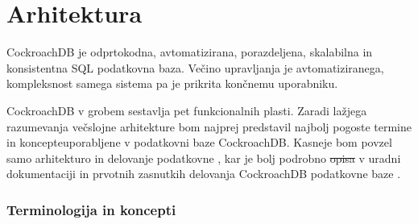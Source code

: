 \documentclass[a4paper, 12pt]{book}
\providecommand{\DIFaddtex}[1]{{\protect\color{blue}\uwave{#1}}} %
\providecommand{\DIFdeltex}[1]{{\protect\color{red}\sout{#1}}}                      %
\providecommand{\DIFaddbegin}{} %
\providecommand{\DIFaddend}{} %
\providecommand{\DIFdelbegin}{} %
\providecommand{\DIFdelend}{} %
\providecommand{\DIFadd}[1]{\texorpdfstring{\DIFaddtex{#1}}{#1}} %
\providecommand{\DIFdel}[1]{\texorpdfstring{\DIFdeltex{#1}}{}} %
\newcommand{\DIFscaledelfig}{0.5}
\newlength{\DIFdelgraphicswidth} %
\newlength{\DIFdelgraphicsheight} %
\newcommand{\DIFaddincludegraphics}[2][]{{\color{blue}\fbox{\DIFOincludegraphics[#1]{#2}}}} %
\newcommand{\DIFdelincludegraphics}[2][]{%
\sbox{\DIFdelgraphicsbox}{\DIFOincludegraphics[#1]{#2}}%
\settoboxwidth{\DIFdelgraphicswidth}{\DIFdelgraphicsbox} %
\settoboxtotalheight{\DIFdelgraphicsheight}{\DIFdelgraphicsbox} %
\scalebox{\DIFscaledelfig}{%
\parbox[b]{\DIFdelgraphicswidth}{\usebox{\DIFdelgraphicsbox}\\[-\baselineskip] \rule{\DIFdelgraphicswidth}{0em}}\llap{\resizebox{\DIFdelgraphicswidth}{\DIFdelgraphicsheight}{%
\setlength{\unitlength}{\DIFdelgraphicswidth}%
\begin{picture}(1,1)%
\thicklines\linethickness{2pt} %
{\color[rgb]{1,0,0}\put(0,0){\framebox(1,1){}}}%
{\color[rgb]{1,0,0}\put(0,0){\line( 1,1){1}}}%
{\color[rgb]{1,0,0}\put(0,1){\line(1,-1){1}}}%
\end{picture}%
}\hspace*{3pt}}} %
} %
\DeclareRobustCommand{\DIFaddbegin}{\DIFOaddbegin \let\includegraphics\DIFaddincludegraphics} %
\DeclareRobustCommand{\DIFaddend}{\DIFOaddend \let\includegraphics\DIFOincludegraphics} %
\DeclareRobustCommand{\DIFdelbegin}{\DIFOdelbegin \let\includegraphics\DIFdelincludegraphics} %
\DeclareRobustCommand{\DIFdelend}{\DIFOaddend \let\includegraphics\DIFOincludegraphics} %
\begin{document}
\section{Arhitektura}

CockroachDB je odprtokodna, avtomatizirana, porazdeljena, skalabilna in konsistentna SQL podatkovna baza. Večino upravljanja je avtomatiziranega, kompleksnost samega sistema pa je prikrita končnemu uporabniku. 

CockroachDB v grobem sestavlja pet funkcionalnih plasti. Zaradi lažjega razumevanja večslojne arhitekture bom najprej predstavil najbolj pogoste termine in koncepte\DIFaddbegin \DIFadd{, }\DIFaddend uporabljene v podatkovni baze CockroachDB. Kasneje bom povzel samo arhitekturo in delovanje podatkovne \DIFaddbegin \DIFadd{baze}\DIFaddend , kar je bolj podrobno \DIFdelbegin \DIFdel{opisa }\DIFdelend \DIFaddbegin \DIFadd{opisano }\DIFaddend v uradni dokumentaciji \cite{CRDB-home} in prvotnih zasnutkih delovanja CockroachDB podatkovne baze \cite{CRDB-design}.

\subsubsection{Terminologija in koncepti}
\end{document}
